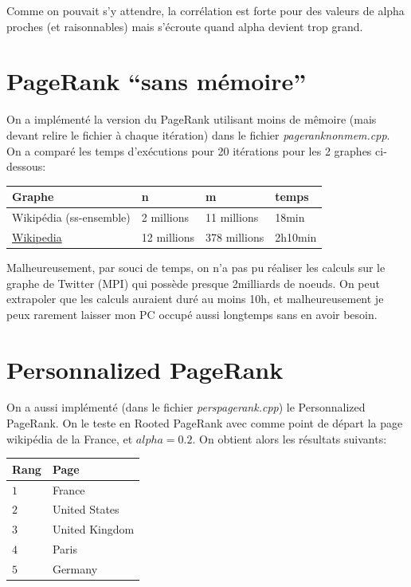 \documentclass[a4paper]{report}
\begin{document}
Comme on pouvait s'y attendre, la corrélation est forte pour des valeurs de alpha proches (et raisonnables) mais s'écroute quand alpha devient trop grand.

\section{PageRank ``sans mémoire''}
On a implémenté la version du PageRank utilisant moins de mêmoire (mais devant relire le fichier à chaque itération) dans le fichier \textit{pageranknonmem.cpp}. On a comparé les temps d'exécutions pour 20 itérations pour les 2 graphes ci-dessous:
\begin{center}
  \begin{tabular}{|l|l|l|l|}
    \hline
    Graphe & n & m & temps\\
    \hline
    Wikipédia (ss-ensemble) & 2 millions & 11 millions & 18min\\
    \href{http://konect.uni-koblenz.de/networks/wikipedia_link_en}{Wikipedia} & 12 millions & 378 millions & 2h10min\\
    \hline
  \end{tabular}
\end{center}
Malheureusement, par souci de temps, on n'a pas pu réaliser les calculs sur le graphe de Twitter (MPI) qui possède presque 2milliards de noeuds. On peut extrapoler que les calculs auraient duré au moins 10h, et malheureusement je peux rarement laisser mon PC occupé aussi longtemps sans en avoir besoin.

\section{Personnalized PageRank}
On a aussi implémenté (dans le fichier \textit{perspagerank.cpp}) le Personnalized PageRank. On le teste en Rooted PageRank avec comme point de départ la page wikipédia de la France, et $alpha = 0.2$. On obtient alors les résultats suivants:

\begin{center}
  \begin{tabular}{|l|l|}
    \hline
    Rang & Page\\
    \hline
    $1$ & France\\
    $2$ & United States\\
    $3$ & United Kingdom\\
    $4$ & Paris\\
    $5$ & Germany\\
    \hline
  \end{tabular}
\end{center}
\end{document}
